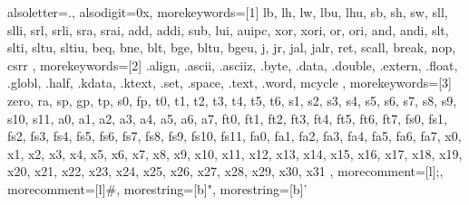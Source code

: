 {
  alsoletter={.}, %
  alsodigit={0x}, %
  morekeywords=[1]{ %
    lb, lh, lw, lbu, lhu,
    sb, sh, sw,
    sll, slli, srl, srli, sra, srai,
    add, addi, sub, lui, auipc,
    xor, xori, or, ori, and, andi,
    slt, slti, sltu, sltiu,
    beq, bne, blt, bge, bltu, bgeu,
    j, jr, jal, jalr, ret,
    scall, break, nop, 
    csrr
  },
  morekeywords=[2]{ %
    .align, .ascii, .asciiz, .byte, .data, .double, .extern,
    .float, .globl, .half, .kdata, .ktext, .set, .space, .text, .word, mcycle
  },
  morekeywords=[3]{ %
    zero, ra, sp, gp, tp, s0, fp,
    t0, t1, t2, t3, t4, t5, t6,
    s1, s2, s3, s4, s5, s6, s7, s8, s9, s10, s11,
    a0, a1, a2, a3, a4, a5, a6, a7,
    ft0, ft1, ft2, ft3, ft4, ft5, ft6, ft7,
    fs0, fs1, fs2, fs3, fs4, fs5, fs6, fs7, fs8, fs9, fs10, fs11,
    fa0, fa1, fa2, fa3, fa4, fa5, fa6, fa7,
    x0, x1, x2, x3, x4, x5, x6, x7, x8, x9, 
    x10, x11, x12, x13, x14, x15, x16, x17, x18, x19,
    x20, x21, x22, x23, x24, x25, x26, x27, x28, x29,
    x30, x31
  },
  morecomment=[l]{;},   %
  morecomment=[l]{\#},  %
  morestring=[b]",      %
  morestring=[b]'       %
}



